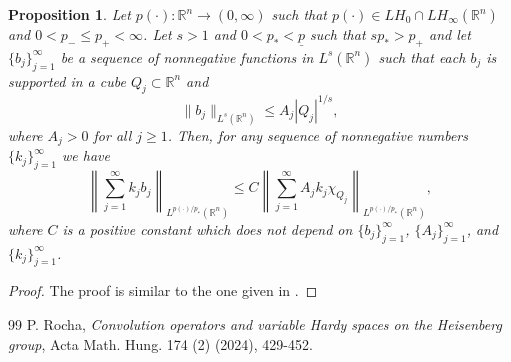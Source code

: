 \documentclass[10pt,a4paper]{amsart}
\newtheorem{proposition}{Proposition}
\begin{document}
\begin{proposition} \label{b_k functions}
Let $p(\cdot) : \mathbb{R}^{n} \to (0, \infty)$ such that $p(\cdot) \in LH_{0} \cap LH_{\infty}(\mathbb{R}^{n})$ and 
$0 < p_{-} \leq p_{+} < \infty$. Let $s > 1$ and $0 < p_{*} < \underline{p}$ such that $s p_{*} > p_{+}$ and let 
$\{ b_j \}_{j=1}^{\infty}$ be a sequence of nonnegative functions in $L^{s}(\mathbb{R}^{n})$ such that each $b_j$ is supported 
in a cube $Q_j \subset \mathbb{R}^{n}$ and
\begin{equation} \label{bks}
\| b_j \|_{L^{s}(\mathbb{R}^{n})} \leq A_j |Q_j|^{1/s},
\end{equation}
where $A_j >0$ for all $j \geq 1$. Then, for any sequence of nonnegative numbers $\{ k_j \}_{j=1}^{\infty}$ we have
\[
\left\| \sum_{j=1}^{\infty} k_j b_j \right\|_{L^{p(\cdot)/p_{*}}(\mathbb{R}^{n})} \leq C \left\| \sum_{j=1}^{\infty} A_j k_j 
\chi_{Q_j} \right\|_{L^{p(\cdot)/p_{*}}(\mathbb{R}^{n})},
\]
where $C$ is a positive constant which does not depend on $\{ b_j \}_{j=1}^{\infty}$, $\{ A_j \}_{j=1}^{\infty}$, and 
$\{ k_j \}_{j=1}^{\infty}$.
\end{proposition}

\begin{proof}
The proof is similar to the one given in \cite[Proposition 3.3]{Rocha2}.
\end{proof}

\begin{thebibliography}{99}
 {\sc P. Rocha}, \textit{Convolution operators and variable Hardy spaces on the Heisenberg group}, Acta Math. Hung. 174 (2) (2024), 429-452.
\end{thebibliography}
\end{document}
